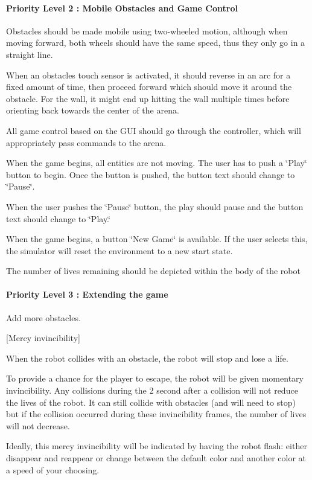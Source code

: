 \paragraph*{Priority Level 2 \+: Mobile Obstacles and Game Control}


\begin{DoxyItemize}
\item Obstacles should be made mobile using two-\/wheeled motion, although when moving forward, both wheels should have the same speed, thus they only go in a straight line.
\item When an obstacle\textquotesingle{}s touch sensor is activated, it should reverse in an arc for a fixed amount of time, then proceed forward which should move it around the obstacle. For the wall, it might end up hitting the wall multiple times before orienting back towards the center of the arena.
\item All game control based on the G\+UI should go through the controller, which will appropriately pass commands to the arena.
\item When the game begins, all entities are not moving. The user has to push a \char`\"{}\+Play\char`\"{} button to begin. Once the button is pushed, the button text should change to \char`\"{}\+Pause\char`\"{}.
\item When the user pushes the \char`\"{}\+Pause\char`\"{} button, the play should pause and the button text should change to \char`\"{}\+Play.\char`\"{}
\item When the game begins, a button \char`\"{}\+New Game\char`\"{} is available. If the user selects this, the simulator will reset the environment to a new start state.
\item The number of lives remaining should be depicted within the body of the robot
\end{DoxyItemize}

\paragraph*{Priority Level 3 \+: Extending the game}


\begin{DoxyItemize}
\item Add more obstacles.
\item \mbox{[}Mercy invincibility\mbox{]}
\begin{DoxyItemize}
\item When the robot collides with an obstacle, the robot will stop and lose a life.
\item To provide a chance for the player to escape, the robot will be given momentary invincibility. Any collisions during the 2 second after a collision will not reduce the lives of the robot. It can still collide with obstacles (and will need to stop) but if the collision occurred during these invincibility frames, the number of lives will not decrease.
\item Ideally, this mercy invincibility will be indicated by having the robot flash\+: either disappear and reappear or change between the default color and another color at a speed of your choosing.
\end{DoxyItemize}
\end{DoxyItemize}

